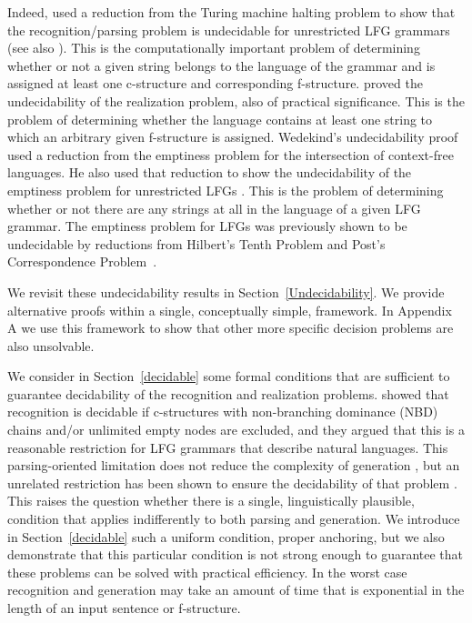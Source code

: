 \documentclass[output=paper,hidelinks]{langscibook}
\begin{document}
Indeed, \citet{kaplanbresnan82} used a reduction from the Turing machine halting problem to show that the recognition/parsing problem is undecidable for unrestricted LFG grammars (see also \citealt{john:88:book}). This is the computationally important problem of determining whether or not a given string belongs to the language of the grammar and is assigned at least one c-structure and corresponding f-structure. \citet{Wedekind2014} proved the undecidability of the realization problem, also of practical significance.
This is the problem of determining whether the language contains at least one string to which an arbitrary given f-structure is assigned.  Wedekind's undecidability proof used a reduction from the emptiness problem for the intersection of context-free languages. He also used that reduction to show the undecidability of the emptiness problem for unrestricted LFGs \citep{Wedekind99}.  This is the problem of determining whether or not there are any strings at all in the language of a given LFG grammar.  The emptiness problem for LFGs was previously shown to be undecidable by reductions from Hilbert's Tenth Problem \citep{Roach1983} and Post's Correspondence \mbox{Problem~\citep{Nishino1991}}.  

We revisit these undecidability results in Section~\ref{Undecidability}.  We provide alternative proofs within a single, conceptually simple, framework.  In Appendix A we use this framework to show that other more specific decision problems are also unsolvable.

We  consider in Section~\ref{decidable} some formal conditions that are sufficient to guarantee decidability of the recognition and realization problems.  \citet{kaplanbresnan82}  showed that recognition is decidable if c-structures with non-branching dominance (NBD) chains and/or unlimited empty nodes are excluded, and they argued that this is a reasonable restriction for LFG grammars that describe natural languages. This parsing-oriented limitation does not reduce the complexity of generation \citep{Wedekind2014}, but an unrelated restriction has been shown to ensure the decidability of that problem \citep{WedekindKaplan:Gen}. This raises the question whether there is a single, linguistically plausible, condition that applies indifferently to both parsing and generation.  We  introduce in Section~\ref{decidable} such a uniform condition, proper anchoring, but we also demonstrate that this particular condition is not strong enough to guarantee that these problems can be solved with practical efficiency.  In the worst case recognition and generation may take an amount of time  that is exponential in the length of an input sentence or f-structure.
 
\end{document}
